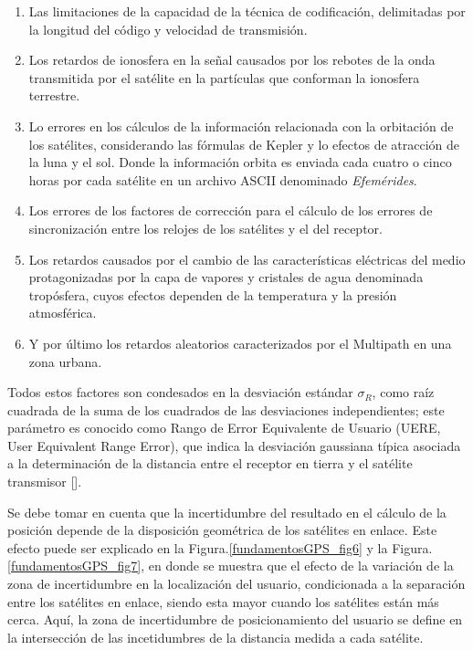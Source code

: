 \documentclass[10pt]{report}
\numberwithin{equation}{chapter}
\numberwithin{algorithm}{chapter}
\newcommand{\bcite}[1]{[\cite{#1}]}
\begin{document}
\begin{enumerate}
\item Las limitaciones de la capacidad de la técnica de codificación, delimitadas por la longitud del código y velocidad de transmisión.
\item Los retardos de ionosfera en la señal causados por los rebotes de la onda transmitida por el satélite en la partículas que conforman la ionosfera terrestre.
\item Lo errores en los cálculos de la información relacionada con la orbitación de los satélites, considerando las fórmulas de Kepler y lo efectos de atracción de la luna y el sol. Donde la información orbita es enviada cada cuatro o cinco horas por cada satélite en un archivo ASCII denominado \emph{Efemérides}.
\item Los errores de los factores de corrección para el cálculo de los errores de sincronización entre los relojes de los satélites y el del receptor.
\item Los retardos causados por el cambio de las características eléctricas del medio protagonizadas por la capa de vapores y cristales de agua denominada tropósfera, cuyos efectos dependen de la temperatura y la presión atmosférica.
\item Y por último los retardos aleatorios caracterizados por el Multipath en una zona urbana.
\end{enumerate}
Todos estos factores son condesados en la desviación estándar $\sigma_R$, como raíz cuadrada de la suma de los cuadrados de las desviaciones independientes; este parámetro es conocido como Rango de Error Equivalente de Usuario (UERE, User Equivalent Range Error), que indica la desviación gaussiana típica asociada a la determinación de la distancia entre el receptor en tierra y el satélite transmisor \bcite{Bradford2001}.\par
Se debe tomar en cuenta que la incertidumbre del resultado en el cálculo de la posición depende de la disposición geométrica de los satélites en enlace. Este efecto puede ser explicado en la Figura.\ref{fundamentosGPS_fig6} y la Figura.\ref{fundamentosGPS_fig7}, en donde se muestra que el efecto de la variación de la zona de incertidumbre en la localización del usuario, condicionada a la separación entre los satélites en enlace, siendo esta mayor cuando los satélites están más cerca. Aquí, la zona de incertidumbre de posicionamiento del usuario se define en la intersección de las incetidumbres de la distancia medida a cada satélite.\par
\end{document}
